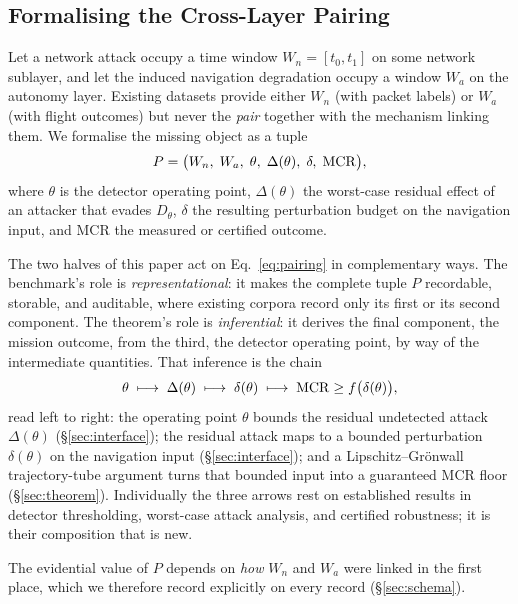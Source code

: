 \subsection{Formalising the Cross-Layer Pairing}
\label{sec:formulation}
Let a network attack occupy a time window $W_n=[t_0,t_1]$ on some network
sublayer, and let the induced navigation degradation occupy a window $W_a$ on
the autonomy layer. Existing datasets provide either $W_n$ (with packet labels)
or $W_a$ (with flight outcomes) but never the \emph{pair} together with the
mechanism linking them. We formalise the missing object as a tuple
\begin{equation}
\label{eq:pairing}
P = \big(W_n,\; W_a,\; \theta,\; \Delta(\theta),\; \delta,\; \mathrm{MCR}\big),
\end{equation}
where $\theta$ is the detector operating point, $\Delta(\theta)$ the worst-case
residual effect of an attacker that evades $D_\theta$, $\delta$ the resulting
perturbation budget on the navigation input, and MCR the measured or certified
outcome.

The two halves of this paper act on Eq.~\eqref{eq:pairing} in complementary
ways. The benchmark's role is \emph{representational}: it makes the complete
tuple $P$ recordable, storable, and auditable, where existing corpora record
only its first or its second component. The theorem's role is
\emph{inferential}: it derives the final component, the mission outcome, from
the third, the detector operating point, by way of the intermediate quantities.
That inference is the chain
\begin{equation}
\label{eq:chain}
\theta \;\longmapsto\; \Delta(\theta) \;\longmapsto\; \delta(\theta)
\;\longmapsto\; \mathrm{MCR} \ge f\big(\delta(\theta)\big),
\end{equation}
read left to right: the operating point $\theta$ bounds the residual undetected
attack $\Delta(\theta)$ (\S\ref{sec:interface}); the residual attack maps to a
bounded perturbation $\delta(\theta)$ on the navigation input
(\S\ref{sec:interface}); and a Lipschitz--Gr\"onwall trajectory-tube argument
turns that bounded input into a guaranteed MCR floor (\S\ref{sec:theorem}).
Individually the three arrows rest on established results in detector
thresholding, worst-case attack analysis, and certified robustness; it is their
composition that is new.

The evidential value of $P$ depends on \emph{how} $W_n$ and $W_a$ were linked in
the first place, which we therefore record explicitly on every record
(\S\ref{sec:schema}).

